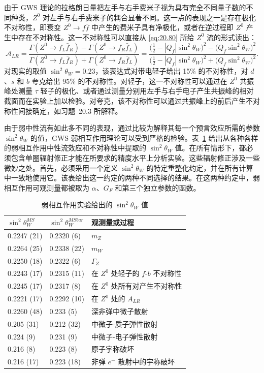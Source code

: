 由于 GWS 理论的拉格朗日量把左手与右手费米子视为具有完全不同量子数的不同种类，$Z^0$ 对左手与右手费米子的耦合显著不同。这一点的表现之一是存在极化不对称性，即衰变 $Z^0\to f\bar{f}$ 中产生的费米子具有净极化，或者在逆过程即 $Z^0$ 产生中存在不对称性。这一不对称性可以直接从 \eqref{eq:20.80} 所给 $Z^0$ 流的形式读出：
\begin{equation}
  \mathcal{A}_{LR} = \frac{\Gamma(Z^0\to f_L\bar{f}_R)
    - \Gamma(Z^0\to f_R\bar{f}_L)}
    {\Gamma(Z^0\to f_L\bar{f}_R) + \Gamma(Z^0\to f_R\bar{f}_L)}
  = \frac{\bigl( \tfrac{1}{2} - |Q_f|\sin^2\theta_W \bigr)^2
    - \bigl( Q_f\sin^2\theta_W \bigr)^2}
    {\bigl( \tfrac{1}{2} - |Q_f|\sin^2\theta_W \bigr)^2
    + \bigl( Q_f\sin^2\theta_W \bigr)^2} .
  \label{eq:20.96}
\end{equation}
对现实的取值 $\sin^2\theta_W = 0.23$，该表达式对带电轻子给出 15\% 的不对称性，对 $d$、$s$ 和 $b$ 夸克给出 95\% 的不对称性。对轻子，这一不对称性可以通过在 $Z^0$ 共振峰处测量 $\tau$ 轻子的极化、或者通过测量分别用左手与右手电子产生共振峰的相对截面而在实验上加以检验。对夸克，该不对称性可以通过共振峰上的前后产生不对称性间接确定，如习题~20.3 所解释。

由于弱中性流有如此多不同的表现，通过比较为解释其每一个预言效应所需的参数 $\sin^2\theta_W$ 的值，GWS 弱相互作用理论可以受到严格的检验。表~\ref{tab:20.1} 给出从各种各样的弱相互作用中性流效应和不对称性中提取的 $\sin^2\theta_W$ 值。在所有情形下，都必须包含单圈辐射修正才能在所要求的精度水平上分析实验。这些辐射修正涉及一些微妙之处。首先，必须采用一个定义 $\sin^2\theta_W$ 的特定重整化约定，并在所有计算中一致地使用它。该表给出这一约定的两种不同选择的结果。在这两种约定中，弱相互作用可观测量都被取为 $\alpha$、$G_F$ 和第三个独立参数的函数。

\begin{table}[t]
  \centering
  \caption{弱相互作用实验给出的 $\sin^2\theta_W$ 值}
  \begin{tabular}{lll}
    \toprule
    $\sin^2\theta^{MS}_W$ & $\sin^2\theta^{MSbar}_W$ & 观测量或过程\\
    \midrule
    0.2247 (21) & 0.2320 (6) & $m_Z$\\
    0.2264 (25) & 0.2338 (22) & $m_W$\\
    0.2250 (18) & 0.2322 (6) & $\Gamma_Z$\\
    0.2243 (17) & 0.2315 (11) & 在 $Z^0$ 处轻子的 $f$-$b$ 不对称性\\
    0.2245 (17) & 0.2317 (8) & 在 $Z^0$ 处所有对产生不对称性\\
    0.2221 (17) & 0.2292 (10) & 在 $Z^0$ 处的 $A_{LR}$\\
    0.2260 (48) & 0.233 (5) & 深非弹中微子散射\\
    0.205 (31) & 0.212 (32) & 中微子-质子弹性散射\\
    0.224 (9) & 0.231 (9) & 中微子-电子弹性散射\\
    0.216 (8) & 0.223 (8) & 原子宇称破坏\\
    0.216 (17) & 0.223 (18) & 非弹 $e^{-}$ 散射中的宇称破坏\\
    \bottomrule
  \end{tabular}
  \label{tab:20.1}
\end{table}

